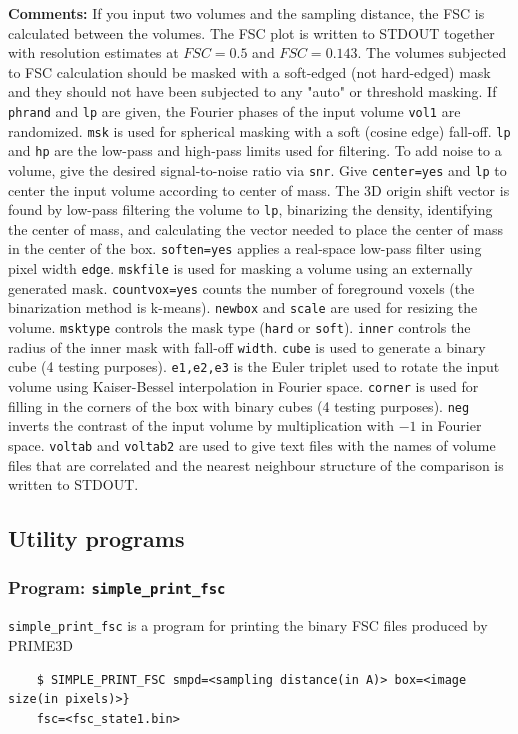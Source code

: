 \documentclass[a4paper,11pt]{article}
\newcommand{\prgname}[1]{\textcolor{NavyBlue}{\texttt{#1}}}
\begin{document}
\noindent\textbf{Comments:} If you input two volumes and the sampling distance, the FSC is calculated between the volumes. The FSC plot is written to STDOUT together with resolution estimates at $FSC=0.5$ and $FSC=0.143$. The volumes subjected to FSC calculation should be masked with a soft-edged (not hard-edged) mask and they should not have been subjected to any "auto" or threshold masking. If \texttt{phrand} and \texttt{lp} are given, the Fourier phases of the input volume \texttt{vol1} are randomized. \texttt{msk} is used for spherical masking with a soft (cosine edge) fall-off. \texttt{lp} and \texttt{hp} are the low-pass and high-pass limits used for filtering. To add noise to a volume, give the desired signal-to-noise ratio via \texttt{snr}. Give \texttt{center=yes} and \texttt{lp} to center the input volume according to center of mass. The 3D origin shift vector is found by low-pass filtering the volume to \texttt{lp}, binarizing the density, identifying the center of mass, and calculating the vector needed to place the center of mass in the center of the box. \texttt{soften=yes} applies a real-space low-pass filter using pixel width \texttt{edge}. \texttt{mskfile} is used for masking a volume using an externally generated mask. \texttt{countvox=yes} counts the number of foreground voxels (the binarization method is k-means). \texttt{newbox} and \texttt{scale} are used for resizing the volume. \texttt{msktype} controls the mask type (\texttt{hard} or \texttt{soft}). \texttt{inner} controls the radius of the inner mask with fall-off \texttt{width}. \texttt{cube} is used to generate a binary cube (4 testing purposes). \texttt{e1,e2,e3} is the Euler triplet used to rotate the input volume using Kaiser-Bessel interpolation in Fourier space. \texttt{corner} is used for filling in the corners of the box with binary cubes (4 testing purposes). \texttt{neg} inverts the contrast of the input volume by multiplication with $-1$ in Fourier space. \texttt{voltab} and \texttt{voltab2} are used to give text files with the names of volume files that are correlated and the nearest neighbour structure of the comparison is written to STDOUT.

\subsection{Utility programs}

\subsubsection{Program: \prgname{simple\_print\_fsc}}
\label{print_fsc}
\prgname{simple\_print\_fsc} is a program for printing the binary FSC files produced by PRIME3D
\begin{verbatim}
    $ SIMPLE_PRINT_FSC smpd=<sampling distance(in A)> box=<image size(in pixels)>}
    fsc=<fsc_state1.bin>
\end{verbatim}
\end{document}
